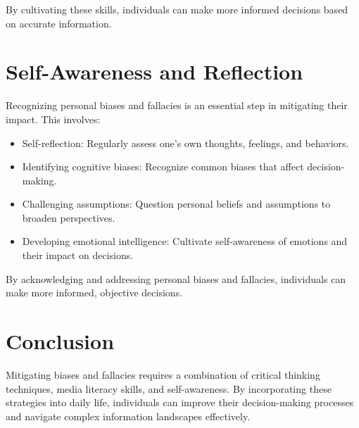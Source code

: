By cultivating these skills, individuals can make more informed decisions based on accurate information.

\section{Self-Awareness and Reflection}

Recognizing personal biases and fallacies is an essential step in mitigating their impact. This involves:

\begin{itemize}
    \item Self-reflection: Regularly assess one's own thoughts, feelings, and behaviors.
    \item Identifying cognitive biases: Recognize common biases that affect decision-making.
    \item Challenging assumptions: Question personal beliefs and assumptions to broaden perspectives.
    \item Developing emotional intelligence: Cultivate self-awareness of emotions and their impact on decisions.
\end{itemize}

By acknowledging and addressing personal biases and fallacies, individuals can make more informed, objective decisions.

\section{Conclusion}

Mitigating biases and fallacies requires a combination of critical thinking techniques, media literacy skills, and self-awareness. By incorporating these strategies into daily life, individuals can improve their decision-making processes and navigate complex information landscapes effectively.
